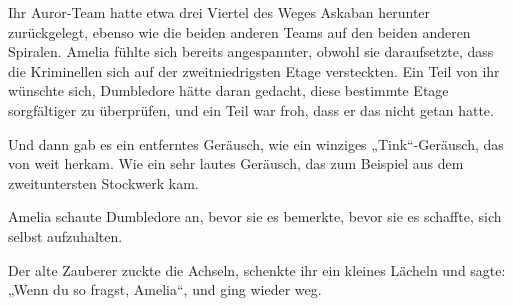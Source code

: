 \later

Ihr Auror-Team hatte etwa drei Viertel des Weges Askaban herunter zurückgelegt, ebenso wie die beiden anderen Teams auf den beiden anderen Spiralen. Amelia fühlte sich bereits angespannter, obwohl sie daraufsetzte, dass die Kriminellen sich auf der zweitniedrigsten Etage versteckten. Ein Teil von ihr wünschte sich, Dumbledore hätte daran gedacht, diese bestimmte Etage sorgfältiger zu überprüfen, und ein Teil war froh, dass er das nicht getan hatte.

Und dann gab es ein entferntes Geräusch, wie ein winziges „Tink“-Geräusch, das von weit herkam. Wie ein sehr lautes Geräusch, das zum Beispiel aus dem zweituntersten Stockwerk kam.

Amelia schaute Dumbledore an, bevor sie es bemerkte, bevor sie es schaffte, sich selbst aufzuhalten.

Der alte Zauberer zuckte die Achseln, schenkte ihr ein kleines Lächeln und sagte: „Wenn du so fragst, Amelia“, und ging wieder weg.

\later

